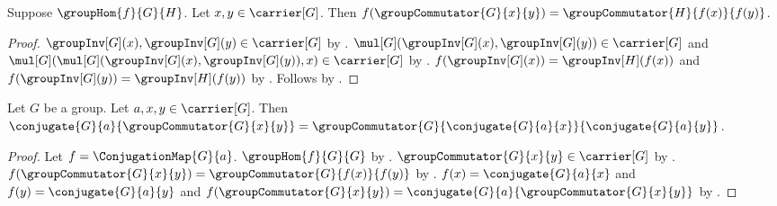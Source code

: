\begin{theorem}\label{group_hom_commutator}
    Suppose $\groupHom{f}{G}{H}$.
    Let $x,y\in\carrier[G]$.
    Then
        $f(\groupCommutator{G}{x}{y})=
            \groupCommutator{H}{f(x)}{f(y)}$.
\end{theorem}
\begin{proof}
    $\groupInv[G](x),\groupInv[G](y)\in\carrier[G]$ by
        .
    $\mul[G](\groupInv[G](x),\groupInv[G](y))\in\carrier[G]$ and
        $\mul[G](
            \mul[G](\groupInv[G](x),\groupInv[G](y)),x)
            \in\carrier[G]$ by
        .
    $f(\groupInv[G](x))=\groupInv[H](f(x))$ and
        $f(\groupInv[G](y))=\groupInv[H](f(y))$ by
        .
    Follows by .
\end{proof}

\begin{theorem}\label{group_commutator_conjugate}
    Let $G$ be a group.
    Let $a,x,y\in\carrier[G]$.
    Then
        $\conjugate{G}{a}{\groupCommutator{G}{x}{y}}=
            \groupCommutator{G}
                {\conjugate{G}{a}{x}}{\conjugate{G}{a}{y}}$.
\end{theorem}
\begin{proof}
    Let $f=\ConjugationMap{G}{a}$.
    $\groupHom{f}{G}{G}$ by .
    $\groupCommutator{G}{x}{y}\in\carrier[G]$ by
        .
    $f(\groupCommutator{G}{x}{y})=
        \groupCommutator{G}{f(x)}{f(y)}$ by
        .
    $f(x)=\conjugate{G}{a}{x}$ and
        $f(y)=\conjugate{G}{a}{y}$ and
        $f(\groupCommutator{G}{x}{y})=
            \conjugate{G}{a}{\groupCommutator{G}{x}{y}}$ by
        .
\end{proof}

